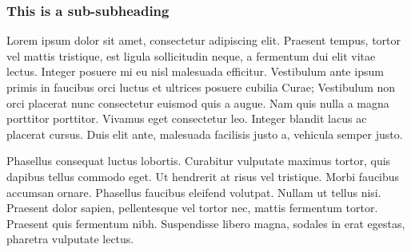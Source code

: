 \documentclass[paper=a4,fontsize=11pt,twocolumn]{article}
\begin{document}
\subsubsection{This is a sub-subheading}
Lorem ipsum dolor sit amet, consectetur adipiscing elit. Praesent tempus, tortor vel mattis tristique, est ligula sollicitudin neque, a fermentum dui elit vitae lectus. Integer posuere mi eu nisl malesuada efficitur. Vestibulum ante ipsum primis in faucibus orci luctus et ultrices posuere cubilia Curae; Vestibulum non orci placerat nunc consectetur euismod quis a augue. Nam quis nulla a magna porttitor porttitor. Vivamus eget consectetur leo. Integer blandit lacus ac placerat cursus. Duis elit ante, malesuada facilisis justo a, vehicula semper justo.

Phasellus consequat luctus lobortis. Curabitur vulputate maximus tortor, quis dapibus tellus commodo eget. Ut hendrerit at risus vel tristique. Morbi faucibus accumsan ornare. Phasellus faucibus eleifend volutpat. Nullam ut tellus nisi. Praesent dolor sapien, pellentesque vel tortor nec, mattis fermentum tortor. Praesent quis fermentum nibh. Suspendisse libero magna, sodales in erat egestas, pharetra vulputate lectus.


\end{document}
